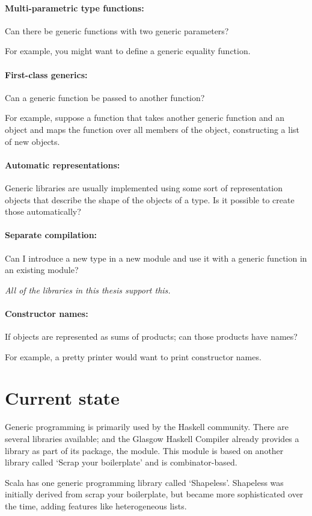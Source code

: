 \paragraph{Multi-parametric type functions:} Can there be generic functions with two generic parameters?

For example, you might want to define a generic equality function.

\paragraph{First-class generics:} Can a generic function be passed to another function?

For example, suppose a function  that takes another generic function 
and an object and maps the function  over all members of the object, constructing
a list of new objects.

\paragraph{Automatic representations:} Generic libraries are usually implemented
using some sort of representation objects that describe the shape of the
objects of a type. Is it possible to create those automatically?

\paragraph{Separate compilation:} Can I introduce a new type in a new module
and use it with a generic function in an existing module?

\textit{All of the libraries in this thesis support this.}

\paragraph{Constructor names:} If objects are represented as sums of products;
can those products have names?

For example, a pretty printer would want to print constructor names.


\section*{Current state}
Generic programming is primarily used by the Haskell community. There are
several libraries available; and the Glasgow Haskell Compiler already provides
a library as part of its  package, the  module. This
module is based on another library called `Scrap your boilerplate'\cite{DBLP:conf/tldi/LammelJ03}
and is combinator-based.

Scala has one generic programming library called `Shapeless'. Shapeless was
initially derived from scrap your boilerplate, but became more sophisticated
over the time, adding features like heterogeneous lists.

